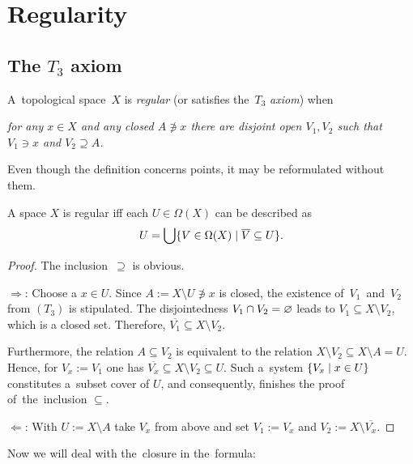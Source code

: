 \chapter{Regularity}

\section{The $T_3$ axiom}

\begin{framed}
  \begin{df}[$T_3$]
    A~topological space~$X$ is \emph{regular\/} (or satisfies the~$T_3$
    \emph{axiom\/}) when
    \begin{center} \it
      for any $x\in X$ and any closed $A \not\owns x$ there are disjoint open
      $V_1, V_2$ such that $V_1\owns x$ and $V_2\supseteq A$.
    \end{center}
  \end{df}
\end{framed}

Even though the definition concerns points, it may be reformulated without
them.

\begin{prop} \label{topreg-char}
  A space $X$ is regular iff each $U\in \Omega(X)$ can be described as
  \[
    U = \bigcup \{V\in \Omega(X) \mid \overline{V} \subseteq U\}.
  \]
\end{prop}
\begin{proof}
  The inclusion~$\supseteq$ is obvious.

  $\Rightarrow$:
  Choose a $x\in U$.
  Since $A := X\setminus U \not\owns x$ is closed, the existence
  of~$V_1$~and~$V_2$ from $(T_3)$ is stipulated.
  The disjointedness $V_1 \cap V_2 = \varnothing$ leads to $V_1\subseteq X\setminus
  V_2$, which is a closed set.
  Therefore, $\overline{V_1}\subseteq X\setminus V_2$.

  Furthermore, the relation $A\subseteq V_2$ is equivalent to the relation
  $X\setminus V_2\subseteq X \setminus A = U$.
  Hence, for $V_x := V_1$ one has $\overline{V_x}\subseteq X\setminus V_2\subseteq
  U$.
  Such a~system $\{V_x \mid x\in U\}$ constitutes a~subset cover of $U$, and
  consequently, finishes the proof of~the~inclusion $\subseteq$.

  $\Leftarrow$:
  With $U := X\setminus A$ take $V_x$ from above and set $V_1 := V_x$ and $V_2
  := X\setminus \overline{V_x}$.
\end{proof}

Now we will deal with the~closure in the~formula:

